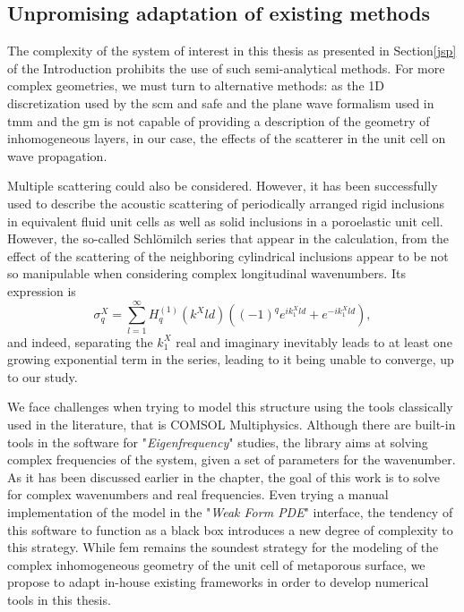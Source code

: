 \subsection{Unpromising adaptation of existing methods}
The complexity of the system of interest in this thesis as presented in Section\ref{jsp} of the Introduction prohibits the use of such semi-analytical methods. For more complex geometries, we must turn to alternative methods: as the 1D discretization used by the \acrshort{scm} and \acrshort{safe} and the plane wave formalism used in \acrshort{tmm} and the \acrshort{gm} is not capable of providing a description of the geometry of inhomogeneous layers, in our case, the effects of the scatterer in the unit cell on wave propagation. 

Multiple scattering could also be considered. However, it has been successfully used to describe the acoustic scattering of periodically arranged rigid inclusions in equivalent fluid unit cells \cite{groby2011} as well as solid inclusions in a poroelastic unit cell\cite{weisser2016}. However, the so-called Schlömilch series that appear in the calculation, from the effect of the scattering of the neighboring cylindrical inclusions appear to be not so manipulable when considering complex longitudinal wavenumbers. Its expression is  
\begin{equation}
    \sigma_q^X=\sum_{l=1}^\infty H_q^{(1)}(k^Xld)\left((-1)^qe^{ik_1^Xld}+e^{-ik_1^Xld}\right),
\end{equation}
and indeed, separating the $k_1^X$ real and imaginary inevitably leads to at least one growing exponential term in the series, leading to it being unable to converge, up to our study. 

We face challenges when trying to model this structure using the tools classically used in the literature, that is COMSOL Multiphysics. Although there are built-in tools in the software for "\emph{Eigenfrequency}" studies, the library aims at solving complex frequencies of the system, given a set of parameters for the wavenumber. As it has been discussed earlier in the chapter, the goal of this work is to solve for complex wavenumbers and real frequencies. Even trying a manual implementation of the model in the "\emph{Weak Form PDE}" interface, the tendency of this software to function as a black box introduces a new degree of complexity to this strategy. While \acrshort{fem} remains the soundest strategy for the modeling of the complex inhomogeneous geometry of the unit cell of metaporous surface, we propose to adapt in-house existing frameworks in order to develop numerical tools in this thesis.  

